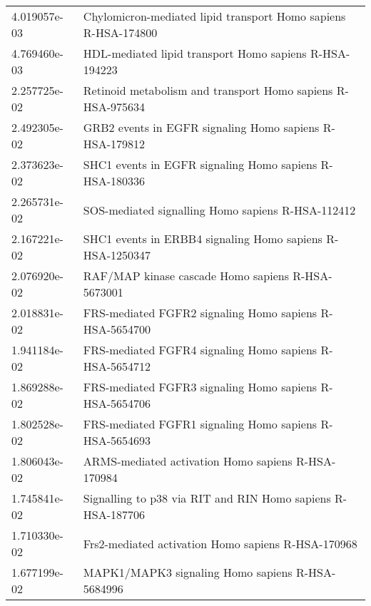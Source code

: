 \begin{longtable}{p{2.4cm}p{14.5cm}}
             4.019057e-03 &                                Chylomicron-mediated lipid transport Homo sapiens R-HSA-174800 \\
             4.769460e-03 &                                        HDL-mediated lipid transport Homo sapiens R-HSA-194223 \\
             2.257725e-02 &                                   Retinoid metabolism and transport Homo sapiens R-HSA-975634 \\
             2.492305e-02 &                                       GRB2 events in EGFR signaling Homo sapiens R-HSA-179812 \\
             2.373623e-02 &                                       SHC1 events in EGFR signaling Homo sapiens R-HSA-180336 \\
             2.265731e-02 &                                             SOS-mediated signalling Homo sapiens R-HSA-112412 \\
             2.167221e-02 &                                     SHC1 events in ERBB4 signaling Homo sapiens R-HSA-1250347 \\
             2.076920e-02 &                                             RAF/MAP kinase cascade Homo sapiens R-HSA-5673001 \\
             2.018831e-02 &                                       FRS-mediated FGFR2 signaling Homo sapiens R-HSA-5654700 \\
             1.941184e-02 &                                       FRS-mediated FGFR4 signaling Homo sapiens R-HSA-5654712 \\
             1.869288e-02 &                                       FRS-mediated FGFR3 signaling Homo sapiens R-HSA-5654706 \\
             1.802528e-02 &                                       FRS-mediated FGFR1 signaling Homo sapiens R-HSA-5654693 \\
             1.806043e-02 &                                            ARMS-mediated activation Homo sapiens R-HSA-170984 \\
             1.745841e-02 &                                   Signalling to p38 via RIT and RIN Homo sapiens R-HSA-187706 \\
             1.710330e-02 &                                            Frs2-mediated activation Homo sapiens R-HSA-170968 \\
             1.677199e-02 &                                              MAPK1/MAPK3 signaling Homo sapiens R-HSA-5684996 \\

\end{longtable}
